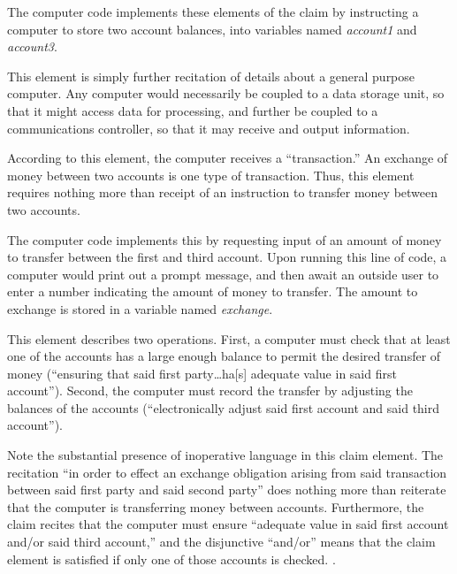 \documentclass{scotus}
\begin{document}
The computer code implements these elements of the claim by instructing a
computer to store two account balances, into variables named \emph{account1} and
\emph{account3}.


This element is simply further recitation of details about a general purpose
computer. Any computer would necessarily be coupled to a data storage unit, so
that it might access data for processing, and further be coupled to a
communications controller, so that it may receive and output information.


According to this element, the computer receives a ``transaction.'' An exchange
of money between two accounts is one type of transaction. Thus, this element
requires nothing more than receipt of an instruction to transfer money between
two accounts.

The computer code implements this by requesting input of an amount of money to
transfer between the first and third account. Upon running this line of code,
a computer would print out a prompt message, and then await an outside user to
enter a number indicating the amount of money to transfer. The amount to
exchange is stored in a variable named \emph{exchange}.


This element describes two operations. First, a computer must check that at
least one of the accounts has a large enough balance to permit the desired
transfer of money (``ensuring that said first party\ldots ha[s] adequate value
in
said first account''). Second, the computer must record the transfer by
adjusting the balances of the accounts (``electronically adjust said first
account and said third account'').

Note the substantial presence of inoperative language in this claim element. The
recitation ``in order to effect an exchange obligation arising from said
transaction between said first party and said second party'' does nothing more
than reiterate that the computer is transferring money between accounts.
Furthermore, the claim recites that the computer must ensure ``adequate value in
said first account and/or said third account,'' and the disjunctive ``and/or''
means that the claim element is satisfied if only one of those accounts is
checked. .
\end{document}
